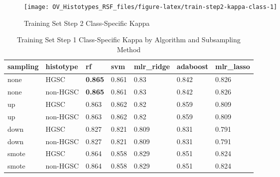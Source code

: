 \documentclass[
]{report}
\begin{document}
\begin{figure}[H]

{\centering \texttt{[image: OV\_Histotypes\_RSF\_files/figure-latex/train-step2-kappa-class-1]} 

}

\caption{Training Set Step 2 Class-Specific Kappa}\label{fig:train-step2-kappa-class}
\end{figure}

\begin{table}

\caption{\label{tab:train-step1-kappa-class-table}Training Set Step 1 Class-Specific Kappa by Algorithm and Subsampling Method}
\centering
\begin{tabular}[t]{l|l|l|l|l|l|l}
\hline
sampling & histotype & rf & svm & mlr\_ridge & adaboost & mlr\_lasso\\
\hline
none & HGSC & \textbf{0.865} & 0.861 & 0.83 & 0.842 & 0.826\\
\hline
none & non-HGSC & \textbf{0.865} & 0.861 & 0.83 & 0.842 & 0.826\\
\hline
up & HGSC & 0.863 & 0.862 & 0.82 & 0.859 & 0.809\\
\hline
up & non-HGSC & 0.863 & 0.862 & 0.82 & 0.859 & 0.809\\
\hline
down & HGSC & 0.827 & 0.821 & 0.809 & 0.831 & 0.791\\
\hline
down & non-HGSC & 0.827 & 0.821 & 0.809 & 0.831 & 0.791\\
\hline
smote & HGSC & 0.864 & 0.858 & 0.829 & 0.851 & 0.824\\
\hline
smote & non-HGSC & 0.864 & 0.858 & 0.829 & 0.851 & 0.824\\
\hline
\end{tabular}
\end{table}
\end{document}
